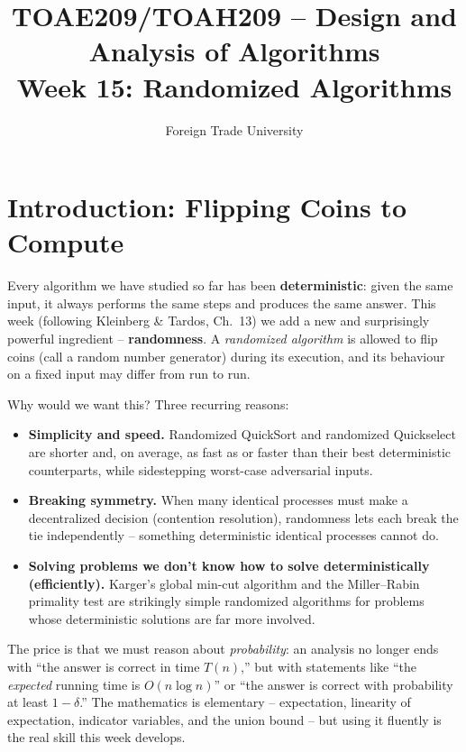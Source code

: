\documentclass[11pt]{article}
\title{TOAE209/TOAH209 -- Design and Analysis of Algorithms\\[4pt]
\large Week 15: Randomized Algorithms}
\author{Foreign Trade University}
\date{}
\begin{document}
\maketitle
\tableofcontents

\section{Introduction: Flipping Coins to Compute}

Every algorithm we have studied so far has been \textbf{deterministic}: given the
same input, it always performs the same steps and produces the same answer. This
week (following Kleinberg \& Tardos, Ch.\ 13) we add a new and surprisingly
powerful ingredient -- \textbf{randomness}. A \emph{randomized algorithm} is
allowed to flip coins (call a random number generator) during its execution, and
its behaviour on a fixed input may differ from run to run.

Why would we want this? Three recurring reasons:

\begin{itemize}
    \item \textbf{Simplicity and speed.} Randomized QuickSort and randomized
    Quickselect are shorter and, on average, as fast as or faster than their best
    deterministic counterparts, while sidestepping worst-case adversarial inputs.
    \item \textbf{Breaking symmetry.} When many identical processes must make a
    decentralized decision (contention resolution), randomness lets each break the
    tie independently -- something deterministic identical processes cannot do.
    \item \textbf{Solving problems we don't know how to solve deterministically
    (efficiently).} Karger's global min-cut algorithm and the Miller--Rabin
    primality test are strikingly simple randomized algorithms for problems whose
    deterministic solutions are far more involved.
\end{itemize}

The price is that we must reason about \emph{probability}: an analysis no longer
ends with ``the answer is correct in time $T(n)$,'' but with statements like ``the
\emph{expected} running time is $O(n \log n)$'' or ``the answer is correct with
probability at least $1 - \delta$.'' The mathematics is elementary -- expectation,
linearity of expectation, indicator variables, and the union bound -- but using it
fluently is the real skill this week develops.
\end{document}
